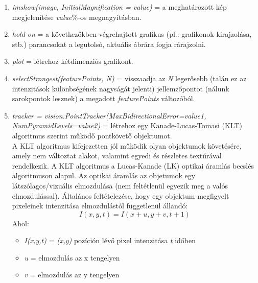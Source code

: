 \documentclass[12pt]{report}
\begin{document}
\begin{enumerate}
                    \item \textit{imshow(image, InitialMagnification = value)} = a meghatározott kép megjelenítése \textit{value}\%-os megnagyításban.
                    \item \textit{hold on} = a következőkben végrehajtott grafikus (pl.: grafikonok kirajzolása, stb.) parancsokat a legutolsó, aktuális ábrára fogja rárajzolni.
                    \item \textit{plot} = létrehoz kétdimenziós grafikont.
                    \item \textit{selectStrongest(featurePoints, N)} = visszaadja az \textit{N} legerősebb (talán ez az intenzitások különbségének nagyságát jelenti) jellemzőpontot (nálunk sarokpontok lesznek) a megadott \textit{featurePoints} változóból.
                    \item \textit{tracker = vision.PointTracker(MaxBidirectionalError=value1, NumPyramidLevels=value2)} = létrehoz egy Kanade-Lucas-Tomasi (KLT) algoritmus szerint működő pontkövető objektumot.\\
                    A KLT algoritmus kifejezetten jól működik olyan objektumok követésére, amely nem változtat alakot, valamint egyedi és részletes textúrával rendelkezik. A KLT algoritmus a Lucas-Kanade (LK) optikai áramlás becslés algoritmuson alapul. Az optikai áramlás az objetumok egy látszólagos/vizuális elmozdulása (nem feltétlenül egyezik meg a valós elmozdulással). Általános feltételezése, hogy egy objektum megfigyelt pixeleinek intenzitása elmozdulástól függetlenül állandó:
                    \[I(x,y,t) = I(x + u,y + v,t + 1)\]
                    Ahol:
                    \begin{itemize}
                        \item \textit{I(x,y,t)} = \textit{(x,y)} pozíción lévő pixel intenzitása \textit{t} időben
                        \item \textit{u} = elmozdulás az x tengelyen
                        \item \textit{v} = elmozdulás az y tengelyen
                    \end{itemize}


\end{enumerate}
\end{document}
